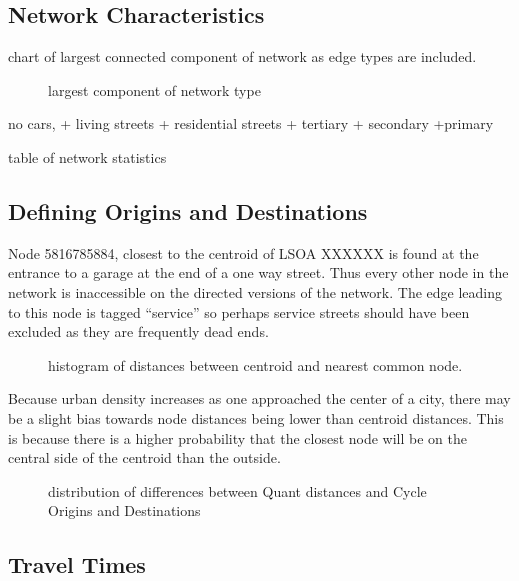\subsection{Network Characteristics}

chart of largest connected component of network as edge types are included. 

\begin{figure}
\centering
\caption{largest component of network type}
\label{fig:connected_component}
\end{figure}

no cars,
+ living streets
+ residential streets
+ tertiary 
+ secondary
+primary

\begin{table}
\centering
\caption{table of network statistics}
\label{table:network_stats}
\end{table}

\subsection{Defining Origins and Destinations}

Node 5816785884, closest to the centroid of LSOA XXXXXX is found at the entrance to a garage at the end of a one way street. Thus every other node in the network is inaccessible on the directed versions of the network. The edge leading to this node is tagged ``service'' so perhaps service streets should have been excluded as they are frequently dead ends. 

\begin{figure}
\centering
\caption{histogram of distances between centroid and nearest common node. }
\label{fig:centroid_node_dist_hist}
\end{figure}

Because urban density increases as one approached the center of a city, there may be a slight bias towards node distances being lower than centroid distances. This is because there is a higher probability that the closest node will be on the central side of the centroid than the outside. 



\begin{figure}
\centering
\caption{distribution of differences between Quant distances and Cycle Origins and Destinations}
\label{fig:diff_dist}
\end{figure}

\subsection{Travel Times}

